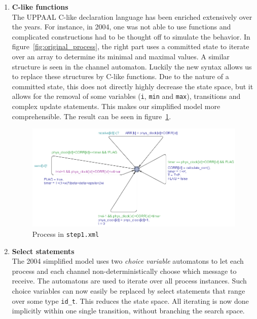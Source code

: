 \documentclass[a4paper,10pt]{article}
\newcommand{\UPPAAL}{UPPAAL\xspace}
\newcommand{\oldsimple}{2004 simplified model\xspace}
\newcommand{\newsimple}{our simplified model\xspace}
\begin{document}
\begin{enumerate}
\item \textbf{C-like functions} \\
	The \UPPAAL C-like declaration language has been enriched extensively over the years. For instance, in 2004, one was not able to use functions and complicated constructions had to be thought off to simulate the behavior. In figure~\ref{fig:original_process}, the right part uses a committed state to iterate over an array to determine its minimal and maximal values. A similar structure is seen in the channel automaton. Luckily the new syntax allows us to replace these structures by C-like functions. Due to the nature of a committed state, this does not directly highly decrease the state space, but it allows for the removal of some variables (\texttt{i}, \texttt{min} and \texttt{max}), transitions and complex update statements. This makes \newsimple more comprehensible. The result can be seen in figure~\ref{fig:step1_process}.

\begin{figure}[!h]
\includegraphics[width=\textwidth]{step1_process}
\caption{Process in \texttt{step1.xml}\label{fig:step1_process}}
\end{figure}

\item \textbf{Select statements} \\
	The \oldsimple uses two \textit{choice variable} automatons to let each process and each channel non-deterministically choose which message to receive. The automatons are used to iterate over all process instances. Such choice variables can now easily be replaced by select statements that range over some type \texttt{id\_t}. This reduces the state space. All iterating is now done implicitly within one single transition, without branching the search space.


\end{enumerate}
\end{document}
